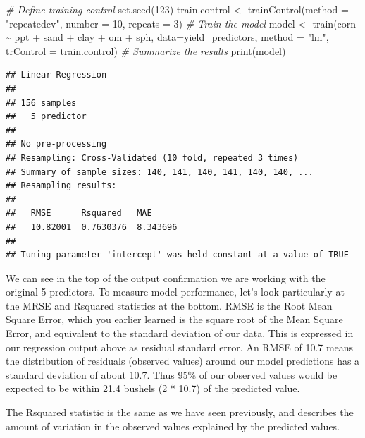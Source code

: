 \documentclass[
]{book}
\newenvironment{Shaded}{\begin{snugshade}}{\end{snugshade}}
\newcommand{\AttributeTok}[1]{\textcolor[rgb]{0.77,0.63,0.00}{#1}}
\newcommand{\CommentTok}[1]{\textcolor[rgb]{0.56,0.35,0.01}{\textit{#1}}}
\newcommand{\DecValTok}[1]{\textcolor[rgb]{0.00,0.00,0.81}{#1}}
\newcommand{\FunctionTok}[1]{\textcolor[rgb]{0.00,0.00,0.00}{#1}}
\newcommand{\NormalTok}[1]{#1}
\newcommand{\OtherTok}[1]{\textcolor[rgb]{0.56,0.35,0.01}{#1}}
\newcommand{\SpecialCharTok}[1]{\textcolor[rgb]{0.00,0.00,0.00}{#1}}
\newcommand{\StringTok}[1]{\textcolor[rgb]{0.31,0.60,0.02}{#1}}
\begin{document}
\begin{Shaded}
\begin{Highlighting}[]
\CommentTok{\# Define training control}
\FunctionTok{set.seed}\NormalTok{(}\DecValTok{123}\NormalTok{)}
\NormalTok{train.control }\OtherTok{\textless{}{-}} \FunctionTok{trainControl}\NormalTok{(}\AttributeTok{method =} \StringTok{"repeatedcv"}\NormalTok{, }
                              \AttributeTok{number =} \DecValTok{10}\NormalTok{, }\AttributeTok{repeats =} \DecValTok{3}\NormalTok{)}
\CommentTok{\# Train the model}
\NormalTok{model }\OtherTok{\textless{}{-}} \FunctionTok{train}\NormalTok{(corn }\SpecialCharTok{\textasciitilde{}}\NormalTok{ ppt }\SpecialCharTok{+}\NormalTok{ sand }\SpecialCharTok{+}\NormalTok{ clay }\SpecialCharTok{+}\NormalTok{ om }\SpecialCharTok{+}\NormalTok{ sph, }\AttributeTok{data=}\NormalTok{yield\_predictors, }\AttributeTok{method =} \StringTok{"lm"}\NormalTok{,}
               \AttributeTok{trControl =}\NormalTok{ train.control)}
\CommentTok{\# Summarize the results}
\FunctionTok{print}\NormalTok{(model)}
\end{Highlighting}
\end{Shaded}

\begin{verbatim}
## Linear Regression 
## 
## 156 samples
##   5 predictor
## 
## No pre-processing
## Resampling: Cross-Validated (10 fold, repeated 3 times) 
## Summary of sample sizes: 140, 141, 140, 141, 140, 140, ... 
## Resampling results:
## 
##   RMSE      Rsquared   MAE     
##   10.82001  0.7630376  8.343696
## 
## Tuning parameter 'intercept' was held constant at a value of TRUE
\end{verbatim}

We can see in the top of the output confirmation we are working with the original 5 predictors. To measure model performance, let's look particularly at the MRSE and Rsquared statistics at the bottom. RMSE is the Root Mean Square Error, which you earlier learned is the square root of the Mean Square Error, and equivalent to the standard deviation of our data. This is expressed in our regression output above as residual standard error. An RMSE of 10.7 means the distribution of residuals (observed values) around our model predictions has a standard deviation of about 10.7. Thus 95\% of our observed values would be expected to be within 21.4 bushels (2 * 10.7) of the predicted value.

The Rsquared statistic is the same as we have seen previously, and describes the amount of variation in the observed values explained by the predicted values.
\end{document}
